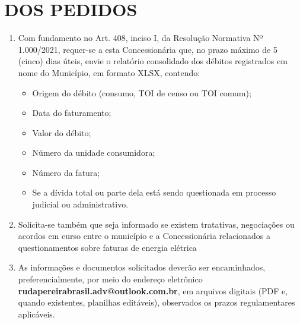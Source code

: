  


\newcommand{\Peticao}{PETIÇÃO DE RELATÓRIO DE DÍVIDAS}
\newcommand{\NumeroDoc}{005}



\renewcommand{\ExibirUnidadeConsumidora}{0}





\section{DOS PEDIDOS}

\begin{enumerate}[resume]
  \item Com fundamento no Art. 408, inciso I, da Resolução Normativa Nº 1.000/2021, requer-se a esta Concessionária que, no prazo máximo de 5 (cinco) dias úteis, envie o relatório consolidado dos débitos registrados em nome do Município, em formato XLSX, contendo: 
  \begin{itemize}
    \item Origem do débito (consumo, TOI de censo ou TOI comum);
    \item Data do faturamento;
    \item Valor do débito;
    \item Número da unidade consumidora;
    \item Número da fatura;
    \item Se a dívida total ou parte dela está sendo questionada em processo judicial ou administrativo.
  \end{itemize}
\item Solicita-se também que seja informado se existem tratativas, negociações ou acordos em curso entre o município e a Concessionária relacionados a questionamentos sobre faturas de energia elétrica 
\item As informações e documentos solicitados deverão ser encaminhados, preferencialmente, por meio do endereço eletrônico \textbf{rudapereirabrasil.adv@outlook.com.br}, em arquivos digitais (PDF e, quando existentes, planilhas editáveis), observados os prazos regulamentares aplicáveis.
\end{enumerate}





